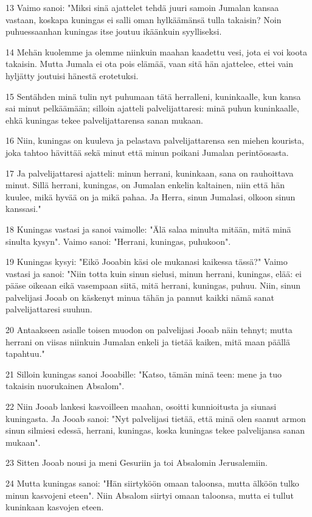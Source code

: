 \par 13 Vaimo sanoi: "Miksi sinä ajattelet tehdä juuri samoin Jumalan kansaa vastaan, koskapa kuningas ei salli oman hylkäämänsä tulla takaisin? Noin puhuessaanhan kuningas itse joutuu ikäänkuin syylliseksi.
\par 14 Mehän kuolemme ja olemme niinkuin maahan kaadettu vesi, jota ei voi koota takaisin. Mutta Jumala ei ota pois elämää, vaan sitä hän ajattelee, ettei vain hyljätty joutuisi hänestä erotetuksi.
\par 15 Sentähden minä tulin nyt puhumaan tätä herralleni, kuninkaalle, kun kansa sai minut pelkäämään; silloin ajatteli palvelijattaresi: minä puhun kuninkaalle, ehkä kuningas tekee palvelijattarensa sanan mukaan.
\par 16 Niin, kuningas on kuuleva ja pelastava palvelijattarensa sen miehen kourista, joka tahtoo hävittää sekä minut että minun poikani Jumalan perintöosasta.
\par 17 Ja palvelijattaresi ajatteli: minun herrani, kuninkaan, sana on rauhoittava minut. Sillä herrani, kuningas, on Jumalan enkelin kaltainen, niin että hän kuulee, mikä hyvää on ja mikä pahaa. Ja Herra, sinun Jumalasi, olkoon sinun kanssasi."
\par 18 Kuningas vastasi ja sanoi vaimolle: "Älä salaa minulta mitään, mitä minä sinulta kysyn". Vaimo sanoi: "Herrani, kuningas, puhukoon".
\par 19 Kuningas kysyi: "Eikö Jooabin käsi ole mukanasi kaikessa tässä?" Vaimo vastasi ja sanoi: "Niin totta kuin sinun sielusi, minun herrani, kuningas, elää: ei pääse oikeaan eikä vasempaan siitä, mitä herrani, kuningas, puhuu. Niin, sinun palvelijasi Jooab on käskenyt minua tähän ja pannut kaikki nämä sanat palvelijattaresi suuhun.
\par 20 Antaakseen asialle toisen muodon on palvelijasi Jooab näin tehnyt; mutta herrani on viisas niinkuin Jumalan enkeli ja tietää kaiken, mitä maan päällä tapahtuu."
\par 21 Silloin kuningas sanoi Jooabille: "Katso, tämän minä teen: mene ja tuo takaisin nuorukainen Absalom".
\par 22 Niin Jooab lankesi kasvoilleen maahan, osoitti kunnioitusta ja siunasi kuningasta. Ja Jooab sanoi: "Nyt palvelijasi tietää, että minä olen saanut armon sinun silmiesi edessä, herrani, kuningas, koska kuningas tekee palvelijansa sanan mukaan".
\par 23 Sitten Jooab nousi ja meni Gesuriin ja toi Absalomin Jerusalemiin.
\par 24 Mutta kuningas sanoi: "Hän siirtyköön omaan taloonsa, mutta älköön tulko minun kasvojeni eteen". Niin Absalom siirtyi omaan taloonsa, mutta ei tullut kuninkaan kasvojen eteen.
